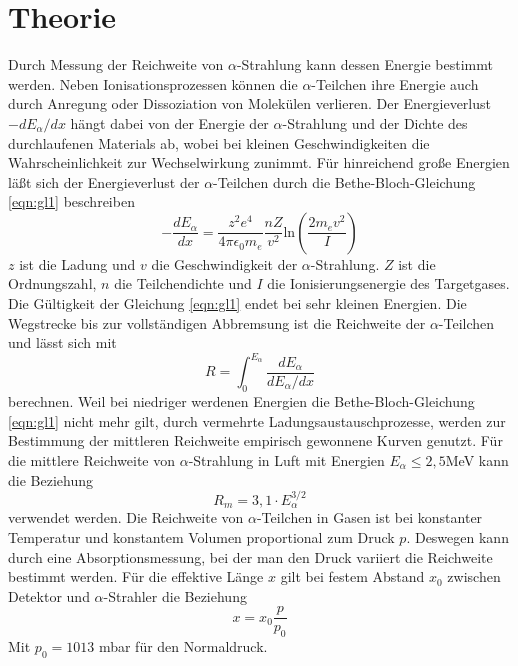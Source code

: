 \section{Theorie}
\label{sec:Theorie}

Durch Messung der Reichweite von $\alpha$-Strahlung kann dessen Energie bestimmt werden.
Neben Ionisationsprozessen können die $\alpha$-Teilchen ihre Energie auch durch Anregung oder Dissoziation von Molekülen verlieren.
Der Energieverlust $-dE_{\alpha}/dx$ hängt dabei von der Energie der $\alpha$-Strahlung und der Dichte des durchlaufenen Materials ab, 
wobei bei kleinen Geschwindigkeiten die Wahrscheinlichkeit zur Wechselwirkung zunimmt.
Für hinreichend große Energien läßt sich der Energieverlust der $\alpha$-Teilchen durch die Bethe-Bloch-Gleichung \ref{eqn:gl1} beschreiben
\begin{equation}
    -\frac{dE_{\alpha}}{dx} = \frac{z^2 e^4}{4 \pi \epsilon_0 m_e} \frac{n Z}{v^2} \text{ln} \left(\frac{2 m_e v^2}{I}\right)
    \label{eqn:gl1}
\end{equation}
$z$ ist die Ladung und $v$ die Geschwindigkeit der $\alpha$-Strahlung.
$Z$ ist die Ordnungszahl, $n$ die Teilchendichte und $I$ die Ionisierungsenergie des Targetgases.
Die Gültigkeit der Gleichung \ref{eqn:gl1} endet bei sehr kleinen Energien.
Die Wegstrecke bis zur vollständigen Abbremsung ist die Reichweite der $\alpha$-Teilchen und lässt sich mit 
\begin{equation}
    R = \int_0^{E_{\alpha}} \frac{dE_{\alpha}}{dE_{\alpha}/dx}
    \label{eqn:gl2}
\end{equation}
berechnen.
Weil bei niedriger werdenen Energien die Bethe-Bloch-Gleichung \ref{eqn:gl1} nicht mehr gilt, durch vermehrte Ladungsaustauschprozesse,
werden zur Bestimmung der mittleren Reichweite empirisch gewonnene Kurven genutzt.
Für die mittlere Reichweite von $\alpha$-Strahlung in Luft mit Energien $E_{\alpha} \leq 2,5$MeV kann die Beziehung 
\begin{equation}
    R_m = 3,1 \cdot E_{\alpha}^{3/2}
    \label{eqn:gl3}
\end{equation}
verwendet werden.
Die Reichweite von $\alpha$-Teilchen in Gasen ist bei konstanter Temperatur und konstantem Volumen proportional zum Druck $p$.
Deswegen kann durch eine Absorptionsmessung, bei der man den Druck variiert die Reichweite bestimmt werden.
Für die effektive Länge $x$ gilt bei festem Abstand $x_0$ zwischen Detektor und $\alpha$-Strahler die Beziehung
\begin{equation}
    x = x_0 \frac{p}{p_0}
\end{equation}
Mit $p_0 = 1013$ mbar für den Normaldruck.